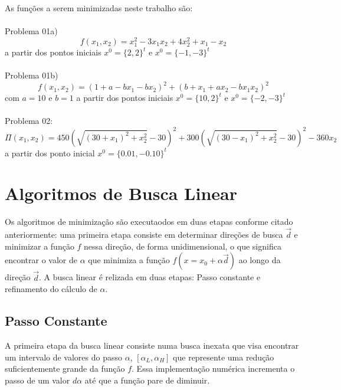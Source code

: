 \documentclass[10pt, a4paper]{article}
\begin{document}
As fun\c c\~oes a serem minimizadas neste trabalho s\~ao: \\
\\
Problema 01a)
\begin{equation}\label{fun:01a}\tag{1a}
      f(x_{1},x_{2})=x_{1}^2 - 3x_{1}x_{2} + 4x_{2}^2 + x_{1} - x_{2}
\end{equation}
a partir dos pontos iniciais $x^0=\{2,2\}^t$ e $x^0=\{-1,-3\}^t$
\\ \\
Problema 01b)
\begin{equation}\label{fun:01b}\tag{1b}
f(x_{1},x_{2}) = (1+a-bx_{1}-bx_{2})^2 + (b+x_{1}+ax_{2} - bx_{1}x_{2})^2
\end{equation}
com $a=10$ e $b=1$ a partir dos pontos iniciais $x^0=\{10,2\}^t$ e $x^0=\{-2,-3\}^t$
\\ \\
Problema 02:
\begin{equation}\label{fun:02}\tag{2}
\Pi(x_{1},x_{2})= 450(\sqrt{(30+x_{1})^2+x_{2}^2}-30)^2 + 300(\sqrt{(30-x_{1})^2+x_{2}^2}-30)^2 -360x_{2}
\end{equation}
a partir dos ponto inicial $x^0=\{0.01,-0.10\}^t$


\section{Algoritmos de Busca Linear}

Os algoritmos de minimiza\c c\~ao s\~ao executaodos em duas etapas conforme citado anteriormente: uma primeira etapa consiste em determinar dire\c c\~oes de busca $\vec{d}$ e minimizar a fun\c c\~ao $f$ nessa dire\c c\~ao, de forma unidimensional, o que significa encontrar o valor de  $\alpha$ que minimiza a fun\c c\~ao $f(x=x_{0}+\alpha\vec{d})$ ao longo da dire\c c\~ao $\vec{d}$. A busca linear \'e relizada em duas etapas: Passo constante e refinamento do c\'alculo de $\alpha$.

\subsection{Passo Constante}

A primeira etapa da busca linear consiste numa busca inexata que visa encontrar um intervalo de valores do passo $\alpha$, $[\alpha_{L}, \alpha_{H}]$ que represente uma redu\c c\~ao suficientemente grande da fun\c c\~ao $f$. Essa implementa\c c\~ao num\'erica incrementa o passo de um valor $d\alpha$ at\'e que a fun\c c\~ao pare de diminuir.
\end{document}
